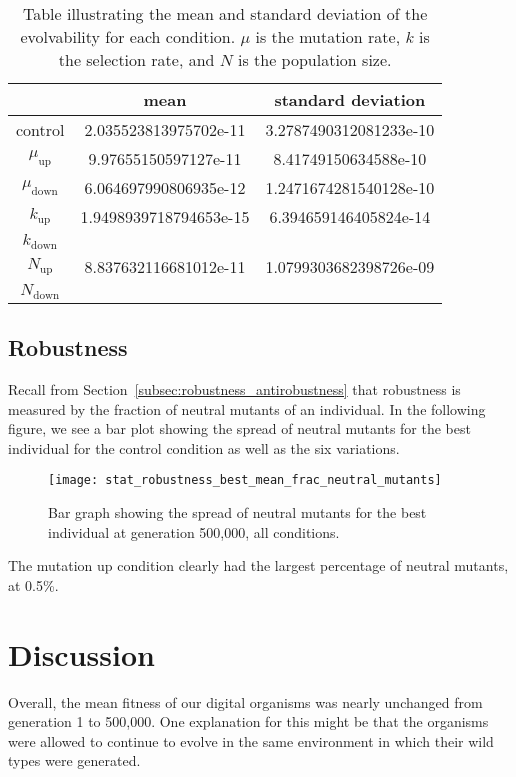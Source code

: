 \begin{table}[H]
	\centering
	\begin{tabular}{| c | c | c |}
		\hline
		 & \textbf{mean} & \textbf{standard deviation}\\
		 \hline
		 \hline
		 control & 2.035523813975702e-11 & 3.2787490312081233e-10\\
		 \hline
		 $\mu_\text{up}$ & 9.97655150597127e-11 & 8.41749150634588e-10 \\
		 \hline
		 $\mu_\text{down}$ & 6.064697990806935e-12 & 1.2471674281540128e-10 \\
		 \hline
		 $k_\text{up}$ & 1.9498939718794653e-15 & 6.394659146405824e-14 \\
		 \hline
		 $k_\text{down}$ & & \\
		 \hline
		 $N_\text{up}$ & 8.837632116681012e-11 & 1.0799303682398726e-09 \\
		 \hline
		 $N_\text{down}$ & & \\
		 \hline	 		 
	\end{tabular}
	\caption[Evolvability mean and standard deviation]{Table illustrating the mean and standard deviation of the evolvability for each condition. $\mu$ is the mutation rate, $k$ is the selection rate, and $N$ is the population size.}
	\label{table:mean_std_dev_evolvability}
\end{table}
\subsection{Robustness}
Recall from Section~\ref{subsec:robustness_antirobustness} that robustness is measured by the fraction of neutral mutants of an individual. In the following figure, we see a bar plot showing the spread of neutral mutants for the best individual for the control condition as well as the six variations. 

\begin{figure}[H]
	\centering
	\texttt{[image: stat\_robustness\_best\_mean\_frac\_neutral\_mutants]}
	\caption[Robustness bar graph]{Bar graph showing the spread of neutral mutants for the best individual at generation 500,000, all conditions.}
	\label{fig:mean_robustness_all_conditions}
\end{figure}
The mutation up condition clearly had the largest percentage of neutral mutants, at 0.5\%. 
\section{Discussion}\label{discussion}
Overall, the mean fitness of our digital organisms was nearly unchanged from generation 1 to 500,000. One explanation for this might be that the organisms were allowed to continue to evolve in the same environment in which their wild types were generated. 
